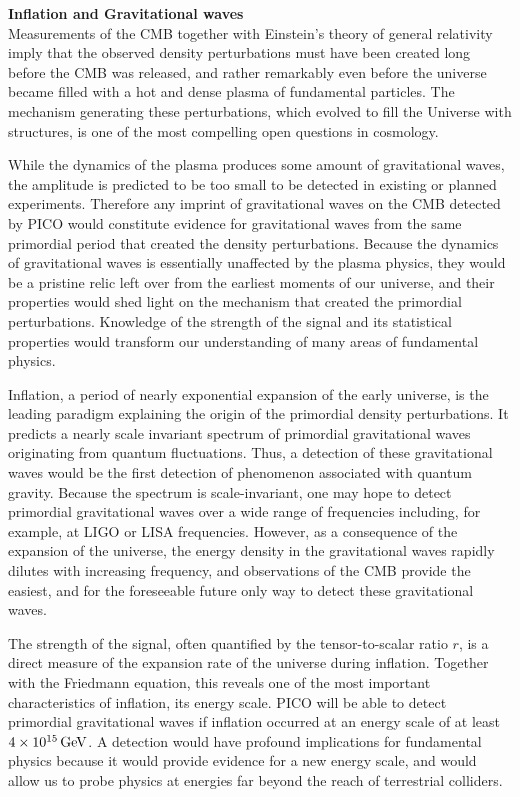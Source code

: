 \documentclass[PICOReport.tex]{subfiles}
\begin{document}
{\bf Inflation and Gravitational waves} \\ %
Measurements of the \ac{CMB} together with Einstein's theory of general relativity imply that the 
observed density perturbations must have been created long before the \ac{CMB} was released, 
and rather remarkably even before the universe became filled with a hot and dense plasma of 
fundamental particles. The mechanism generating these perturbations, 
which evolved to fill the Universe with structures, is one of the most compelling open questions 
in cosmology.

While the dynamics of the plasma produces some amount of gravitational waves, the amplitude 
is predicted to be too small to be detected in existing or planned experiments. 
Therefore any imprint of gravitational waves on the \ac{CMB} detected by PICO would constitute 
evidence for gravitational waves from the same primordial period that created the density perturbations. 
Because the dynamics of gravitational waves is essentially unaffected by the plasma physics, 
they would be a pristine relic left over from the earliest moments of our universe, and their properties 
would shed light on the mechanism that created the primordial perturbations. 
Knowledge of the strength of the 
signal and its statistical properties would transform our understanding of many areas of fundamental physics. 

Inflation, a period of nearly exponential expansion of the early universe, is the leading paradigm 
explaining the origin of the primordial density perturbations. It predicts a nearly scale invariant 
spectrum of primordial gravitational waves originating from quantum fluctuations. Thus, a detection 
of these gravitational waves would be the first detection of phenomenon associated with 
quantum gravity. Because the spectrum is scale-invariant, one may hope to detect primordial 
gravitational waves over a wide range of frequencies including, for example, at LIGO or LISA frequencies. 
However, as a consequence of the expansion of the universe, the energy density in the gravitational 
waves rapidly dilutes with increasing frequency, and observations of the CMB provide the easiest, 
and for the foreseeable future only way to detect these gravitational waves. 

The strength of the signal, often quantified by the tensor-to-scalar ratio $r$, is a direct measure of 
the expansion rate of the universe during inflation. Together with the Friedmann equation, this reveals 
one of the most important characteristics of inflation, its energy scale. PICO will be able to 
detect primordial gravitational waves if inflation occurred at an energy scale of at 
least $4\times 10^{15}\,\rm{GeV}$.  A detection would have profound implications for fundamental 
physics because it would provide evidence for a new energy scale, and would allow us to probe 
physics at energies far beyond the reach of terrestrial colliders.
\end{document}
